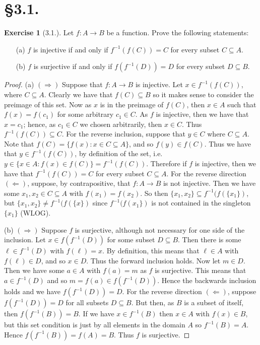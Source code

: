 \documentclass[9pt,reqno]{amsart}
\theoremstyle{definition}
\newtheorem{exercise}{Exercise}[section]
\begin{document}
\section*{\S 3.1. }
\begin{exercise}[3.1.] Let $ f \colon A \to B$ be a function. Prove the following statements:
\begin{itemize}
	\item [(a)] $f$ is injective if and only if $f^{-1}(f(C)) = C$ for every subset $C \subseteq A$.
	\item [(b)] $f$ is surjective if and only if $f(f^{-1}(D)) = D$ for every subset $D \subseteq B$.
\end{itemize}

\begin{proof}
	(a) $(\Rightarrow )$ Suppose that $f \colon A \to B$ is injective. Let $x \in f^{-1} (f(C))$, where $C \subseteq A$. Clearly we have that $f (C) \subseteq B$ so it makes sense to consider the preimage of this set. Now as $x$ is in the preimage of $f(C)$, then $x \in A$ such that $f(x) = f(c_1)$ for some arbitrary $c_1 \in C$. As $f$ is injective, then we have that $x = c_1$; hence, as $c_1 \in C$ we chosen arbitrarily, then $x \in C$. Thus $ f^{-1} (f(C)) \subseteq C$. For the reverse inclusion, suppose that $y \in C$ where $C \subseteq A$. Note that $f(C) = \{ f(x) \colon x \in C \subseteq A \}$, and so $f(y) \in f(C)$. Thus we have that $y \in f^{-1}(f(C))$, by definition of the set, i.e. $y \in \{ x \in A \colon f(x) \in f(C) \} = f^{-1} (f(C))$. Therefore if $f$ is injective, then we have that $f^{-1}(f(C)) = C$ for every subset $ C \subseteq A$. For the reverse direction $(\Leftarrow)$, suppose, by contrapositive, that $f \colon A \to B$ is not injective. Then we have some $x_1, x_2 \in C \subseteq A$ with $f(x_1) = f(x_2)$. So then $\{x_1, x_2 \} \subseteq f^{-1} (f(\{x_1 \})$, but $\{x_1 , x_2 \} \neq f^{-1} (f(\{x \})$ since $f^{-1} (f(x_1\})$ is not contained in the singleton $\{x_1 \}$ (WLOG).
	
	(b) $(\Rightarrow)$ Suppose $f$ is surjective, although not necessary for one side of the inclusion. Let $x \in f(f^{-1} (D))$ for some subset $D \subseteq B$. Then there is some $\ell \in f^{-1}(D)$ with $f(\ell ) =x$. By definition, this means that $\ell \in A$ with $f(\ell ) \in D$, and so $x \in D$. Thus the forward inclusion holds. Now let $m \in D$. Then we have some $a \in A$ with $f(a) = m$ as $f$ is surjective. This means that $a \in f^{-1} (D)$ and so $m = f(a) \in f(f^{-1}(D))$. Hence the backwards inclusion holds and we have $f (f^{-1} (D)) = D$. For the reverse direction $(\Leftarrow)$, suppose $f(f^{-1}(D)) =D$ for all subsets $D \subseteq B$. But then, as $B$ is a subset of itself, then $f(f^{-1} (B)) = B$. If we have $x \in f^{-1} (B)$ then $x \in A$ with $f(x) \in B$, but this set condition is just by all elements in the domain $A$ so $f^{-1} (B) = A$. Hence $f(f^{-1}(B)) = f(A) = B$. Thus $f$ is surjective. 
\end{proof}
	
\end{exercise}
\end{document}
